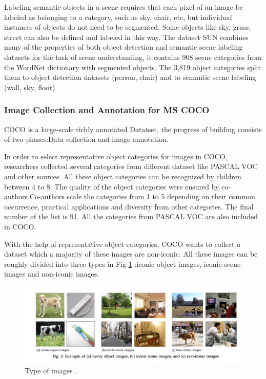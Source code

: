 \documentclass[
]{krantz}
\begin{document}
Labeling semantic objects in a scene requires that each pixel of an image be labeled as belonging to a category, such as sky, chair, etc, but individual instances of objects do not need to be segmented. \citep{mccoco} Some objects like sky, grass, street can also be defined and labeled in this way.
The dataset SUN \citep{sun} combines many of the properties of both object detection and semantic scene labeling datasets for the task of scene understanding, it contains 908 scene categories from the WordNet dictionary \citep{WordNet} with segmented objects.
The 3,819 object categories split them to object detection datasets (person, chair) and to semantic scene labeling (wall, sky, floor). \citep{mccoco}

\hypertarget{image-collection-and-annotation-for-ms-coco}{%
\subsubsection{Image Collection and Annotation for MS COCO}\label{image-collection-and-annotation-for-ms-coco}}

COCO is a large-scale richly annotated Datatset, the progress of building consists of two phases:Data collection and image annotation.

In order to select representative object categories for images in COCO, researchers collected several categories from different dataset like PASCAL VOC \citep{pascalvoc} and other sources. All these object categories can be recognized by children between 4 to 8. The quality of the object categories were ensured by co-authors.Co-authors scale the categories from 1 to 5 depending on their common occurrence, practical applications and diversity from other categories. \citep{mccoco} The final number of the list is 91. All the categories from PASCAL VOC are also included in COCO. \citep{pascalvoc}

With the help of representative object categories, COCO wants to collect a dataset which a majority of these images are non-iconic. All these images can be roughly divided into three types in Fig \ref{fig:imagetype} :iconic-object images, iconic-scene images and non-iconic images.\citep{mccoco}

\begin{figure}

{\centering \includegraphics[width=1\linewidth]{figures/02-01/2.1 imagetype} 

}

\caption{Type of images \citep{mccoco}.}\label{fig:imagetype}
\end{figure}
\end{document}
